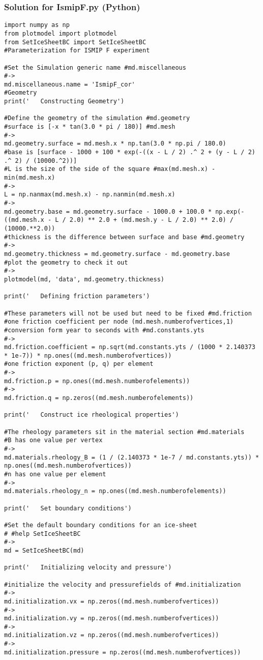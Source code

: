 \subsubsection{Solution for IsmipF.py (Python)}%
\begin{lstlisting}
import numpy as np
from plotmodel import plotmodel
from SetIceSheetBC import SetIceSheetBC
#Parameterization for ISMIP F experiment

#Set the Simulation generic name #md.miscellaneous
#->
md.miscellaneous.name = 'IsmipF_cor'
#Geometry
print('   Constructing Geometry')

#Define the geometry of the simulation #md.geometry
#surface is [-x * tan(3.0 * pi / 180)] #md.mesh
#->
md.geometry.surface = md.mesh.x * np.tan(3.0 * np.pi / 180.0)
#base is [surface - 1000 + 100 * exp(-((x - L / 2) .^ 2 + (y - L / 2) .^ 2) / (10000.^2))]
#L is the size of the side of the square #max(md.mesh.x) - min(md.mesh.x)
#->
L = np.nanmax(md.mesh.x) - np.nanmin(md.mesh.x)
#->
md.geometry.base = md.geometry.surface - 1000.0 + 100.0 * np.exp(-((md.mesh.x - L / 2.0) ** 2.0 + (md.mesh.y - L / 2.0) ** 2.0) / (10000.**2.0))
#thickness is the difference between surface and base #md.geometry
#->
md.geometry.thickness = md.geometry.surface - md.geometry.base
#plot the geometry to check it out
#->
plotmodel(md, 'data', md.geometry.thickness)

print('   Defining friction parameters')

#These parameters will not be used but need to be fixed #md.friction
#one friction coefficient per node (md.mesh.numberofvertices,1)
#conversion form year to seconds with #md.constants.yts
#->
md.friction.coefficient = np.sqrt(md.constants.yts / (1000 * 2.140373 * 1e-7)) * np.ones((md.mesh.numberofvertices))
#one friction exponent (p, q) per element
#->
md.friction.p = np.ones((md.mesh.numberofelements))
#->
md.friction.q = np.zeros((md.mesh.numberofelements))

print('   Construct ice rheological properties')

#The rheology parameters sit in the material section #md.materials
#B has one value per vertex
#->
md.materials.rheology_B = (1 / (2.140373 * 1e-7 / md.constants.yts)) * np.ones((md.mesh.numberofvertices))
#n has one value per element
#->
md.materials.rheology_n = np.ones((md.mesh.numberofelements))

print('   Set boundary conditions')

#Set the default boundary conditions for an ice-sheet
# #help SetIceSheetBC
#->
md = SetIceSheetBC(md)

print('   Initializing velocity and pressure')

#initialize the velocity and pressurefields of #md.initialization
#->
md.initialization.vx = np.zeros((md.mesh.numberofvertices))
#->
md.initialization.vy = np.zeros((md.mesh.numberofvertices))
#->
md.initialization.vz = np.zeros((md.mesh.numberofvertices))
#->
md.initialization.pressure = np.zeros((md.mesh.numberofvertices))
\end{lstlisting}

\clearpage %
